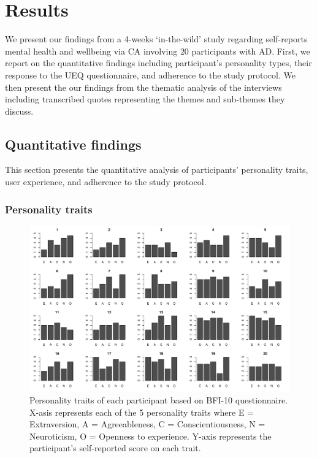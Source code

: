     
    

\section{Results}
    We present our findings from a 4-weeks `in-the-wild' study regarding self-reports mental health and wellbeing via \ac{CA} involving $20$ participants with \ac{AD}.
    First, we report on the quantitative findings including  participant's personality types, their response to the \ac{UEQ} questionnaire, and adherence to the study protocol.
    We then present the our findings from the thematic analysis of the interviews including transcribed quotes representing the themes and sub-themes they discuss.


    \subsection{Quantitative findings}
    This section presents the quantitative analysis of participants' personality traits, user experience, and adherence to the study protocol.
    
    \subsubsection{Personality traits} 
        
    \begin{figure}
        \centering
        \includegraphics[clip, trim=0cm 0cm 0.25cm 0cm, width=\textwidth]{figures/personality.pdf}
        \caption{Personality traits of each participant based on \ac{BFI-10} questionnaire. X-asis represents each of the 5 personality traits where E = Extraversion, A = Agreeableness, C = Conscientiousness, N = Neuroticism, O = Openness to experience. Y-axis represents the participant's self-reported score on each trait.}
        \label{fig:personality}
    \end{figure}
     
